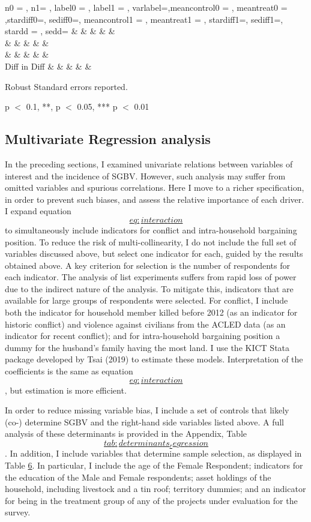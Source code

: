 \documentclass[
]{article}
\begin{document}
n0 = , n1= , label0 = , label1 = , varlabel=,meancontrol0 = , meantreat0
= ,stardiff0=, sediff0=, meancontrol1 = , meantreat1 = , stardiff1=,
sediff1=, stardd = , sedd= \& \& \& \& \&\\
\& \& \& \& \&\\
\& \& \& \& \&\\
Diff in Diff \& \& \& \& \&

Robust Standard errors reported.

p \(<\) 0.1, **, p \(<\) 0.05, *** p \(<\) 0.01

\subsection*{Multivariate Regression
analysis}\label{multivariate-regression-analysis}

In the preceding sections, I examined univariate relations between
variables of interest and the incidence of SGBV. However, such analysis
may suffer from omitted variables and spurious correlations. Here I move
to a richer specification, in order to prevent such biases, and assess
the relative importance of each driver. I expand equation
\hyperref[eq:interaction]{\[eq:interaction\]} to simultaneously include
indicators for conflict and intra-household bargaining position. To
reduce the risk of multi-collinearity, I do not include the full set of
variables discussed above, but select one indicator for each, guided by
the results obtained above. A key criterion for selection is the number
of respondents for each indicator. The analysis of list experiments
suffers from rapid loss of power due to the indirect nature of the
analysis. To mitigate this, indicators that are available for large
groups of respondents were selected. For conflict, I include both the
indicator for household member killed before 2012 (as an indicator for
historic conflict) and violence against civilians from the ACLED data
(as an indicator for recent conflict); and for intra-household
bargaining position a dummy for the husband's family having the most
land. I use the KICT Stata package developed by Tsai (2019) to estimate
these models. Interpretation of the coefficients is the same as equation
\hyperref[eq:interaction]{\[eq:interaction\]}, but estimation is more
efficient.

In order to reduce missing variable bias, I include a set of controls
that likely (co-) determine SGBV and the right-hand side variables
listed above. A full analysis of these determinants is provided in the
Appendix, Table
\hyperref[tab:determinants_regression]{\[tab:determinants_regression\]}.
In addition, I include variables that determine sample selection, as
displayed in Table \hyperref[tab:sample_selection]{6}. In particular, I
include the age of the Female Respondent; indicators for the education
of the Male and Female respondents; asset holdings of the household,
including livestock and a tin roof; territory dummies; and an indicator
for being in the treatment group of any of the projects under evaluation
for the survey.
\end{document}
